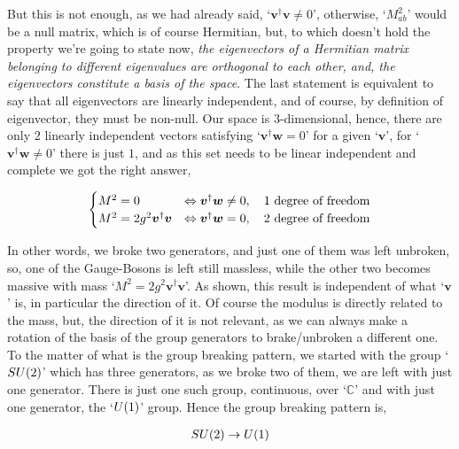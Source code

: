 But this is not enough, as we had already said, `$\boldsymbol v^\dagger \boldsymbol v\neq 0$', otherwise, `$M^2_{ab}$' 
would be a null matrix, which is of course Hermitian, but, to which doesn't hold the property we're going to state now, 
\textit{the eigenvectors of a Hermitian matrix belonging to different eigenvalues are orthogonal to each other, and, the 
eigenvectors constitute a basis of the space}. The last statement is equivalent to say that all eigenvectors are linearly 
independent, and of course, by definition of eigenvector, they must be non-null. Our space is $3$-dimensional, hence, there 
are only $2$ linearly independent vectors satisfying `$\boldsymbol v^\dagger\boldsymbol w=0$' for a given `$\boldsymbol v$',
for `$\boldsymbol v^\dagger\boldsymbol w\neq 0$' there is just $1$, and as this set needs to be linear independent and 
complete we got the right answer,

\begin{align}
    \begin{cases}
        M^2=0&\Leftrightarrow \boldsymbol v^\dagger \boldsymbol w\neq0,\ \ \ \textnormal{$1$ degree of freedom}\\
        M^2=2g^2\boldsymbol v^\dagger\boldsymbol v&\Leftrightarrow\boldsymbol v^\dagger \boldsymbol w=0,\ \ \ \textnormal{$2$ degree of freedom}
    \end{cases}\nonumber
\end{align}

In other words, we broke two generators, and just one of them was left unbroken, so, one of the Gauge-Bosons is left 
still massless, while the other two becomes massive with mass `$M^2=2g^2\boldsymbol v^\dagger\boldsymbol v$'. As shown, 
this result is independent of what `$\boldsymbol v$' is, in particular the direction of it. Of course the modulus is 
directly related to the mass, but, the direction of it is not relevant, as we can always make a rotation of the basis of 
the group generators to brake/unbroken a different one. To the matter of what is the group breaking pattern, we started 
with the group `$SU\qty(2)$' which has three generators, as we broke two of them, we are left with just one generator. 
There is just one such group, continuous, over `$\mathbb C$' and with just one generator, the `$U\qty(1)$' group. Hence 
the group breaking pattern is,

\begin{align}
    SU\qty(2)\rightarrow U\qty(1)\nonumber
\end{align}